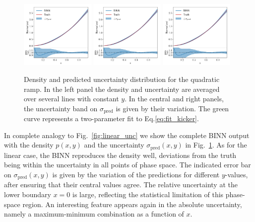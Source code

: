 \begin{figure}[t]
\centering
\includegraphics[width=0.32\textwidth, page=1]{./figures/bINN/quadratic_1dplots}
\includegraphics[width=0.32\textwidth, page=2]{./figures/bINN/quadratic_1dplots}
\includegraphics[width=0.32\textwidth, page=3]{./figures/bINN/quadratic_1dplots}
\caption{Density and predicted uncertainty distribution for the
  quadratic ramp. In the left panel the density and uncertainty are
  averaged over several lines with constant $y$. In the central and
  right panels, the uncertainty band on $\sigma_\text{pred}$ is given
  by their variation.  The green curve represents a two-parameter fit
  to Eq.\eqref{eq:fit_kicker}.}
\label{fig:quadratic_unc}
\end{figure}

In complete analogy to Fig.~\ref{fig:linear_unc} we show the complete
BINN output with the density $p(x,y)$ and the uncertainty
$\sigma_\text{pred}(x,y)$ in Fig.~\ref{fig:quadratic_unc}. As for the
linear case, the BINN reproduces the density well, deviations from the
truth being within the uncertainty in all points of phase
space. The indicated error bar on $\sigma_\text{pred}(x,y)$ is given by the
variation of the predictions for different $y$-values, after ensuring
that their central values agree.  The relative uncertainty at the
lower boundary $x = 0$ is large, reflecting the statistical limitation
of this phase-space region. An interesting feature appears again in
the absolute uncertainty, namely a maximum-minimum combination as a
function of $x$.

